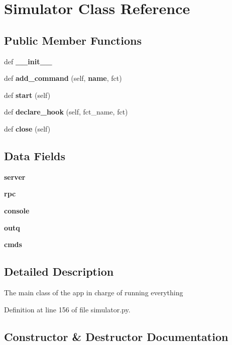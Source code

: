\section{Simulator Class Reference}
\label{classprotolibs_1_1modbus__tk_1_1simulator_1_1_simulator}
\subsection*{Public Member Functions}
\begin{DoxyCompactItemize}
\item 
def {\bf \+\_\+\+\_\+init\+\_\+\+\_\+}
\item 
def {\bf add\+\_\+command} (self, {\bf name}, fct)
\item 
def {\bf start} (self)
\item 
def {\bf declare\+\_\+hook} (self, fct\+\_\+name, fct)
\item 
def {\bf close} (self)
\end{DoxyCompactItemize}
\subsection*{Data Fields}
\begin{DoxyCompactItemize}
\item 
{\bf server}
\item 
{\bf rpc}
\item 
{\bf console}
\item 
{\bf outq}
\item 
{\bf cmds}
\end{DoxyCompactItemize}


\subsection{Detailed Description}
\begin{DoxyVerb}The main class of the app in charge of running everything\end{DoxyVerb}
 

Definition at line 156 of file simulator.\+py.



\subsection{Constructor \& Destructor Documentation}
